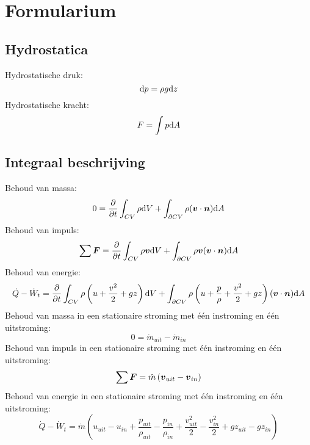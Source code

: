 \chapter{Formularium}


	\section{Hydrostatica}
\begin{multicols}{2}
		Hydrostatische druk:
		\begin{equation}
			\mathrm{d} p = \rho g \mathrm{d} z
		\end{equation}
		Hydrostatische kracht:
		\begin{equation}
			F = \int p \mathrm{d} A
		\end{equation}
\end{multicols}
	\section{Integraal beschrijving}
Behoud van massa:
\begin{equation}
	0 = \frac{\partial}{\partial t} \int_{CV} \rho \mathrm{d} V + \int_{\partial CV} \rho (\boldsymbol{v}\cdot \boldsymbol{n}) \mathrm{d} A
\end{equation}
Behoud van impuls:
\begin{equation}
	\sum \boldsymbol{F} = \frac{\partial}{\partial t} \int_{CV} \rho \boldsymbol{v} \mathrm{d} V + \int_{\partial CV} \rho \boldsymbol{v} (\boldsymbol{v}\cdot \boldsymbol{n}) \mathrm{d} A
\end{equation}
Behoud van energie:
\begin{equation}
	\dot{Q}-\dot{W}_t = \frac{\partial}{\partial t} \int_{CV} \rho \left(u+\frac{v^2}{2}+g z \right) \mathrm{d} V + \int_{\partial CV} \rho \left(u+\frac{p}{\rho}+\frac{v^2}{2}+g z \right) (\boldsymbol{v}\cdot \boldsymbol{n}) \mathrm{d} A
\end{equation}
Behoud van massa in een stationaire stroming met \'e\'en instroming en \'e\'en uitstroming:
\begin{equation}
	0 = \dot{m}_{uit}-\dot{m}_{in}
\end{equation}
Behoud van impuls in een stationaire stroming met \'e\'en instroming en \'e\'en uitstroming:
\begin{equation}
	\sum \boldsymbol{F} = \dot{m} \left( \boldsymbol{v}_{uit}-\boldsymbol{v}_{in} \right)
\end{equation}
Behoud van energie in een stationaire stroming met \'e\'en instroming en \'e\'en uitstroming:
\begin{equation}
	\dot{Q}-\dot{W}_t = \dot{m} \left(u_{uit}-u_{in}+\frac{p_{uit}}{\rho_{uit}}-\frac{p_{in}}{\rho_{in}}+\frac{v_{uit}^2}{2}-\frac{v_{in}^2}{2}+g z_{uit}-g z_{in} \right)
\end{equation}


